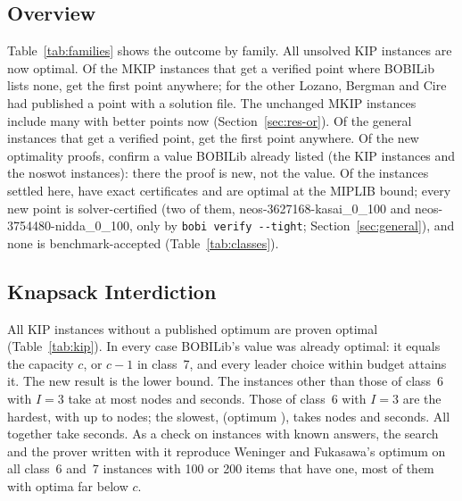 \documentclass[]{spie}  %
\theoremstyle{plain}
\newcommand{\code}[1]{\texttt{#1}}
\newcommand{\inst}[1]{\mbox{#1}}             %
\begin{document}
\subsection{Overview}\label{sec:res-overview}

Table~\ref{tab:families} shows the outcome by family. All \NumKipUnsolved{} unsolved KIP instances
are now optimal. Of the \NumOrFirstPoints{} MKIP instances that get a verified point where BOBILib
lists none, \NumOrFirstAnywhere{} get the first point anywhere; for the other
\NumOrPointNewToBobilib{} Lozano, Bergman and Cire had published a point with a solution file. The
\NumMkipUnchanged{} unchanged MKIP instances include many with better points now
(Section~\ref{sec:res-or}). Of the \NumGeneralFirstPoints{} general instances that get a verified
point, \NumGeneralFirstAnywhere{} get the first point anywhere. Of the \NumNewOptimal{} new
optimality proofs, \NumNewValueKnown{} confirm a value BOBILib already listed (the \NumNewKip{} KIP
instances and the \NumNewValueKnownGeneral{} \inst{noswot} instances): there the proof is new, not
the value. Of the \NumSettledHere{} instances settled
here, \NumClassExactSettled{} have exact certificates and \NumClassNumericalNew{} are optimal at
the MIPLIB bound; every new point is solver-certified (two of them, \inst{neos-3627168-kasai\_0\_100}
and \inst{neos-3754480-nidda\_0\_100}, only by \code{bobi verify -{}-tight}; Section~\ref{sec:general}),
and none is benchmark-accepted (Table~\ref{tab:classes}).

\subsection{Knapsack Interdiction}\label{sec:res-kip}

All \NumNewKip{} KIP instances without a published optimum are proven optimal
(Table~\ref{tab:kip}). In every case BOBILib's value was already optimal: it equals the capacity
$c$, or $c-1$ in class~7, and every leader choice within budget attains it. The new result is the
lower bound. The \NumKipEasy{} instances other than those of class~6 with $I=3$ take at
most \KipEasyMaxNodes{} nodes and \KipEasyMaxCpu{} seconds. Those of class~6 with $I=3$
are the hardest, with up to \KipMostNodes{} nodes; the slowest, \inst{\KipHardestName}
(optimum \KipHardestOptimum), takes \KipHardestNodes{} nodes and \KipHardestCpu{} seconds. All
\NumNewKip{} together take \KipTotalCpu{} seconds. As a check on instances with known answers, the
search and the prover written with it reproduce Weninger and Fukasawa's optimum on all
\NumKipValidation{} class~6 and~7 instances with 100 or 200 items that have one, most of them with
optima far below $c$.
\end{document}
